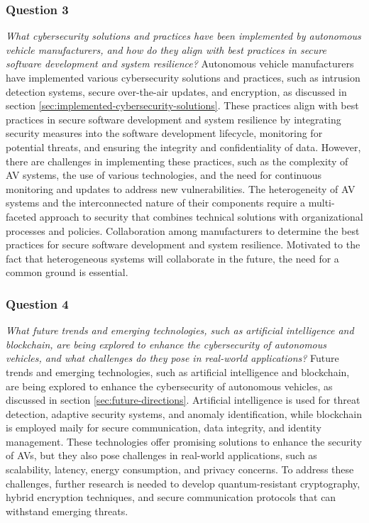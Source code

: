 \subsubsection{Question 3}
\textit{What cybersecurity solutions and practices have been implemented by autonomous vehicle manufacturers, and how do they align with best practices in secure software development and system resilience?}
Autonomous vehicle manufacturers have implemented various cybersecurity solutions and practices, such as intrusion detection systems, secure over-the-air updates, and encryption, as discussed in section \ref{sec:implemented-cybersecurity-solutions}.
These practices align with best practices in secure software development and system resilience by integrating security measures into the software development lifecycle, monitoring for potential threats, and ensuring the integrity and confidentiality of data.
However, there are challenges in implementing these practices, such as the complexity of AV systems, the use of various technologies, and the need for continuous monitoring and updates to address new vulnerabilities.
The heterogeneity of AV systems and the interconnected nature of their components require a multi-faceted approach to security
that combines technical solutions with organizational processes and policies.
Collaboration among manufacturers to determine the best practices for secure software development and system resilience.
Motivated to the fact that heterogeneous systems will collaborate in the future, the need for a common ground is essential.

\subsubsection{Question 4}
\textit{What future trends and emerging technologies, such as artificial intelligence and blockchain, are being explored to enhance the cybersecurity of autonomous vehicles, and what challenges do they pose in real-world applications?}
Future trends and emerging technologies, such as artificial intelligence and blockchain, are being explored to enhance the cybersecurity of autonomous vehicles, as discussed in section \ref{sec:future-directions}.
Artificial intelligence is used for threat detection, adaptive security systems, and anomaly identification, while blockchain is employed maily for secure communication, data integrity, and identity management.
These technologies offer promising solutions to enhance the security of AVs, but they also pose challenges in real-world applications, such as scalability, latency, energy consumption, and privacy concerns.
To address these challenges, further research is needed to develop quantum-resistant cryptography, hybrid encryption techniques, and secure communication protocols that can withstand emerging threats.
